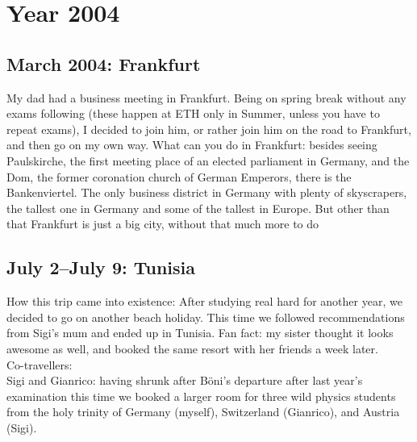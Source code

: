 \chapter{Year 2004}
\label{2004}

\section{March 2004: Frankfurt}
\label{2004:Frankfurt}

My dad had a business meeting in Frankfurt. Being on spring break without any exams following (these happen at ETH only in Summer, unless you have to repeat exams), I decided to join him, or rather join him on the road to Frankfurt, and then go on my own way. What can you do in Frankfurt: besides seeing Paulskirche, the first meeting place of an elected parliament in Germany, and the Dom, the former coronation church of German Emperors, there is the Bankenviertel. The only business district in Germany with plenty of skyscrapers, the tallest one in Germany and some of the tallest in Europe. But other than that Frankfurt is just a big city, without that much more to do

\section{July 2--July 9: Tunisia}
\label{2004:Tunisia}

How this trip came into existence: After studying real hard for another year, we decided to go on another beach holiday. This time we followed recommendations from Sigi's mum and ended up in Tunisia. Fan fact: my sister thought it looks awesome as well, and booked the same resort with her friends a week later.\\

Co-travellers:\\
Sigi and Gianrico: having shrunk after B\"oni's departure after last year's examination this time we booked a larger room for three wild physics students from the holy trinity of Germany (myself), Switzerland (Gianrico), and Austria (Sigi).

